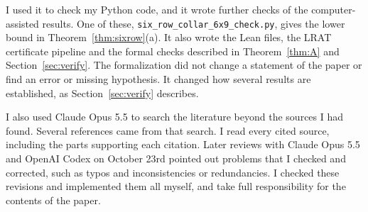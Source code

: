 \documentclass[12pt]{article}
\theoremstyle{plain}
\theoremstyle{definition}
\theoremstyle{remark}
\begin{document}
I used it to check my Python code, and it wrote further checks of the
computer-assisted results. One of these, \texttt{six\_row\_collar\_6x9\_check.py},
gives the lower bound in Theorem~\ref{thm:sixrow}(a).
It also wrote the Lean files, the LRAT certificate pipeline and the formal
checks described in Theorem~\ref{thm:A} and Section~\ref{sec:verify}.
The formalization did not change a statement of the paper or find an error
or missing hypothesis. It changed how several results are established,
as Section~\ref{sec:verify} describes.

I also used Claude Opus 5.5 to search the literature beyond the sources I
had found. Several references came from that search. I read every cited
source, including the parts supporting each citation. Later reviews with
Claude Opus 5.5 and OpenAI Codex on October 23rd pointed out problems that I checked and
corrected, such as typos and inconsistencies or redundancies.
I checked these revisions and implemented them all myself, and take full responsibility for the
contents of the paper.
\end{document}
